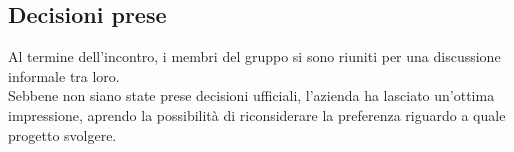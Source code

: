 \subsection{Decisioni prese}
Al termine dell'incontro, i membri del gruppo si sono riuniti per una discussione informale tra loro. \\
Sebbene non siano state prese decisioni ufficiali, l'azienda ha lasciato un'ottima impressione, aprendo la possibilità di riconsiderare la preferenza riguardo a quale progetto svolgere.
